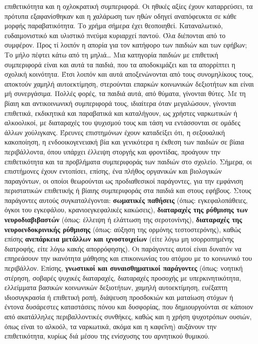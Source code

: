 \documentclass[12pt,a4paper]{book}
\begin{document}
επιθετικότητα και η οχλοκρατική συμπεριφορά. Οι ηθικές αξίες έχουν καταρρεύσει,
τα πρότυπα εξαφανίσθηκαν και η χαλάρωση των ηθών οδηγεί αναπόφευκτα σε κάθε
μορφής παραβατικότητα.
\newline\setlength{\parindent}{40pt}\indent Το χρήμα σήμερα έχει θεοποιηθεί.
Καταναλωτικό, ευδαιμονιστικό και υλιστικό πνεύμα κυριαρχεί παντού. Όλα
διέπονται από το συμφέρον. Προς τί λοιπόν η απορία για τον κατήφορο των παιδιών
και των εφήβων; Το μήλο πέφτει κάτω από τη μηλιά\ldots
\newline\setlength{\parindent}{40pt}\indent Μια κατηγορία παιδιών με επιθετική
συμπεριφορά είναι και αυτά τα παιδιά, που τα αποδοκιμάζει και τα απορρίπτει η
σχολική κοινότητα. Έτσι λοιπόν και αυτά αποξενώνονται από τους συνομηλίκους
τους, αποκτούν χαμηλή αυτοεκτίμηση, στερούνται επαρκών κοινωνικών δεξιοτήτων και
είναι μή συνεργάσιμα. Πολλές φορές, τα παιδιά αυτά, από θύματα, γίνονται θύτες.
Με τη βίαιη και αντικοινωνική συμπεριφορά τους, ιδιαίτερα όταν μεγαλώσουν,
γίνονται επιθετικά, εκδικητικά και παραβατικά και καταλήγουν, ως χρήστες
ναρκωτικών ή αλκοολικοί, με διαταραχές του ψυχισμού τους και τάση να
εντάσσονται σε ομάδες άλλων χούλιγκανς.
\newline\setlength{\parindent}{40pt}\indent Έρευνες επιστημόνων έχουν καταδείξει
ότι, η σεξουαλική κακοποίηση, η ενδοοικογενειακή βία και γενικότερα η έκθεση των
παιδιών σε βίαια περιβάλλοντα, όπου υπάρχει έλλειψη στοργής και φροντίδας,
προάγουν την επιθετικότητα και τα προβλήματα συμπεριφοράς των παιδιών στο
σχολείο.
\newline\setlength{\parindent}{40pt}\indent Σήμερα, οι επιστήμονες έχουν
εντοπίσει, επίσης, ένα πλήθος οργανικών και βιολογικών παραγόντων, οι οποίοι
θεωρούνται ως προδιαθεσικοί παράγοντες, για την εμφάνιση περιστατικών επιθετικής
ή βίαιης συμπεριφοράς στα παιδιά και στους εφήβους. Στους παράγοντες αυτούς
συγκαταλέγονται: \textbf{σωματικές παθήσεις} (όπως: εγκεφαλοπάθειες, όγκοι του
εγκεφάλου, κρανιοεγκεφαλικές κακώσεις), \textbf{διαταραχές της ρύθμισης των
νευροδιαβιβαστών} (όπως: έλλειψη ή ελάττωση της σεροτονίνης), \textbf{διαταραχές
της νευροενδοκρινικής ρύθμισης} (όπως: αύξηση της ορμόνης τεστοστερόνης), καθώς
επίσης \textbf{ανεπάρκεια μετάλλων και ιχνοστοιχείων} (είτε λόγω μη
ισορροπημένης διατροφής, είτε λόγω κακής απορρόφησης). Οι παράγοντες αυτοί είναι δυνατόν να επηρεάσουν την
ικανότητα μάθησης και επικοινωνίας του ατόμου με το κοινωνικό του περιβάλλον.
\newline\setlength{\parindent}{40pt}\indent Επίσης, \textbf{γνωστικοί και
συναισθηματικοί παράγοντες} (όπως: νοητική στέρηση, σοβαρές ψυχικές διαταραχές,
διαταραχές προσοχής με υπερκινητικότητα, ελλείμματα βασικών κοινωνικών
δεξιοτήτων, χαμηλή αυτοεκτίμηση, ευέξαπτη ιδιοσυγκρασία ή επιθετική ροπή,
διάψευση προσδοκιών και ματαίωση στόχων ή έντονα δυσάρεστες καταστάσεις πόνου
και δυσφορίας, που δημιουργούνται σε κάποιον από ακατάλληλες περιβαλλοντικές
συνθήκες, καθώς και η χρήση ψυχοτρόπων ουσιών, όπως είναι το αλκοόλ, τα
ναρκωτικά, ακόμα και η καφεΐνη) αυξάνουν την επιθετικότητα, κυρίως διά μέσου της
ενίσχυσης του αρνητικού θυμικού.
\end{document}
